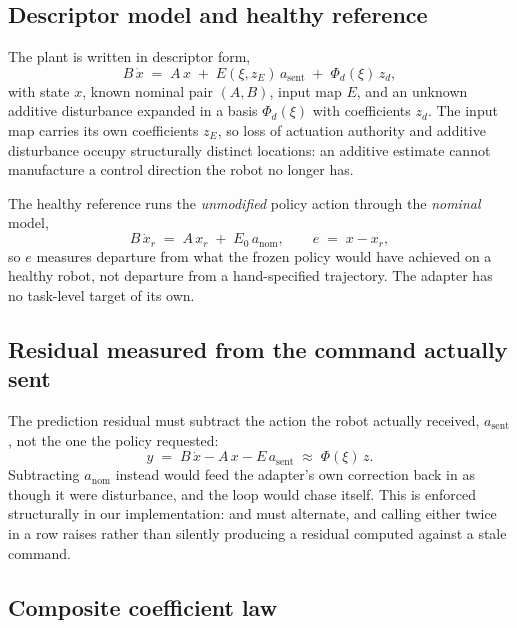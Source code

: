 \subsection{Descriptor model and healthy reference}\label{sec:method:model}

The plant is written in descriptor form,
\begin{equation}
B\,\dot x \;=\; A\,x \;+\; E(\xi,z_E)\,a_{\mathrm{sent}} \;+\; \Phi_d(\xi)\,z_d ,
\label{eq:plant}
\end{equation}
with state $x$, known nominal pair $(A,B)$, input map $E$, and an unknown additive
disturbance expanded in a basis $\Phi_d(\xi)$ with coefficients $z_d$. The input
map carries its own coefficients $z_E$, so loss of actuation authority and additive
disturbance occupy structurally distinct locations: an additive estimate cannot
manufacture a control direction the robot no longer has.

The healthy reference runs the \emph{unmodified} policy action through the
\emph{nominal} model,
\begin{equation}
B\,\dot x_r \;=\; A\,x_r \;+\; E_0\,a_{\mathrm{nom}},
\qquad e \;=\; x - x_r ,
\label{eq:reference}
\end{equation}
so $e$ measures departure from what the frozen policy would have achieved on a
healthy robot, not departure from a hand-specified trajectory. The adapter has no
task-level target of its own.

\subsection{Residual measured from the command actually sent}\label{sec:method:residual}

The prediction residual must subtract the action the robot actually received,
$a_{\mathrm{sent}}$, not the one the policy requested:
\begin{equation}
y \;=\; B\,\dot x - A\,x - E\,a_{\mathrm{sent}} \;\approx\; \Phi(\xi)\,z .
\label{eq:residual}
\end{equation}
Subtracting $a_{\mathrm{nom}}$ instead would feed the adapter's own correction back
in as though it were disturbance, and the loop would chase itself. This is enforced
structurally in our implementation:  and  must
alternate, and calling either twice in a row raises rather than silently producing
a residual computed against a stale command.

\subsection{Composite coefficient law}\label{sec:method:law}

